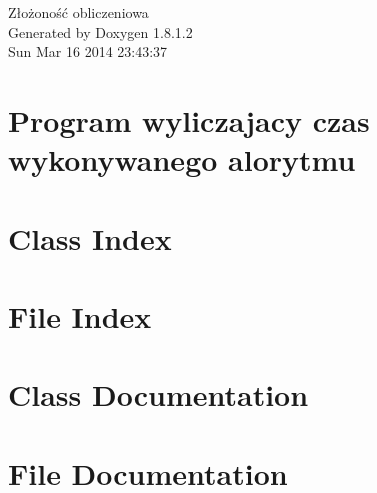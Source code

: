 \documentclass{book}
\begin{document}
\hypersetup{pageanchor=false,citecolor=blue}
\begin{titlepage}
\vspace*{7cm}
\begin{center}
{\Large Złożoność obliczeniowa }\\
\vspace*{1cm}
{\large Generated by Doxygen 1.8.1.2}\\
\vspace*{0.5cm}
{\small Sun Mar 16 2014 23:43:37}\\
\end{center}
\end{titlepage}
\clearemptydoublepage
{}
\tableofcontents
\clearemptydoublepage
{}
\hypersetup{pageanchor=true,citecolor=blue}
\chapter{Program wyliczajacy czas wykonywanego alorytmu}
\label{index}\hypertarget{index}{}
\chapter{Class Index}

\chapter{File Index}

\chapter{Class Documentation}






\chapter{File Documentation}














\printindex
\end{document}

